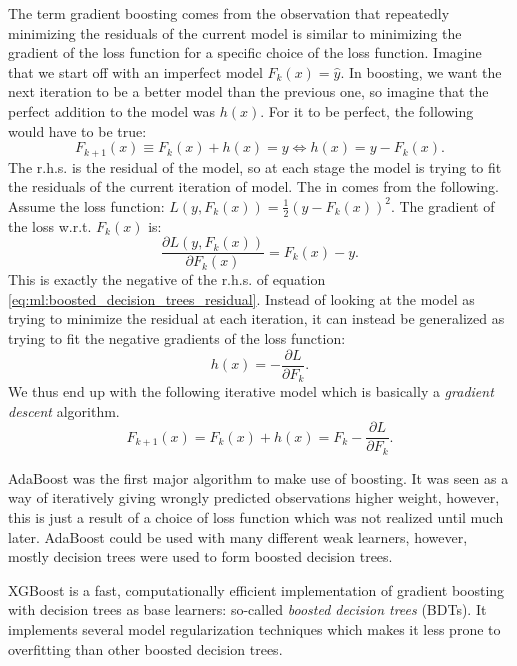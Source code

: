 The term gradient boosting comes from the observation that repeatedly minimizing the residuals of the current model is similar to minimizing the gradient of the loss function for a specific choice of the loss function.
Imagine that we start off with an imperfect model $F_k(x)=\hat{y}$. In boosting, we want the next iteration to be a better model than the previous one, so imagine that the perfect addition to the model was $h(x)$. For it to be perfect, the following would have to be true:
\begin{equation}
  \label{eq:ml:boosted_decision_trees_residual}
  F_{k+1}(x) \equiv F_k(x) + h(x) = y \Leftrightarrow h(x) = y - F_k(x).
\end{equation}
The r.h.s. is the residual of the model, so at each stage the model is trying to fit the residuals of the current iteration of model. The  in  comes from the following. Assume the loss function: $L(y, F_k(x)) = \frac{1}{2}  (y-F_k(x))^2$. The gradient of the loss w.r.t. $F_k(x)$ is:
\begin{equation}
  \frac{\partial L(y, F_k(x))}{\partial F_k(x)} = F_k(x) - y. 
\end{equation}
This is exactly the negative of the r.h.s. of equation \eqref{eq:ml:boosted_decision_trees_residual}. Instead of looking at the model as trying to minimize the residual at each iteration, it can instead be generalized as trying to fit the negative gradients of the loss function:
\begin{equation}
  h(x) = - \frac{\partial L}{\partial F_k}.
\end{equation}
We thus end up with the following iterative model which is basically a \emph{gradient descent} algorithm.
\begin{equation}
  F_{k+1}(x) = F_k(x) + h(x) = F_k - \frac{\partial L}{\partial F_k}.
\end{equation}


AdaBoost \autocite{freundDesiciontheoreticGeneralizationOnline1995} was the first major algorithm to make use of boosting. It was seen as a way of iteratively giving wrongly predicted observations higher weight, however, this is just a result of a  choice of loss function which was not realized until much later. AdaBoost could be used with many different weak learners, however, mostly decision trees were used to form boosted decision trees. 

XGBoost \autocite{chenXGBoostScalableTree2016} is a fast, computationally efficient implementation of gradient boosting with decision trees as base learners: so-called \emph{boosted decision trees} (BDTs). It implements several model regularization techniques which makes it less prone to overfitting than other boosted decision trees. 

